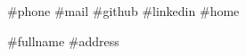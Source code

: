 \boxinfo
{#{phone}}
{#{mail}}
{#{github}}
{#{linkedin}}
{#{home}}

\header
{#{fullname}}
{#{address}}

\begin{abstract}
  \begin{multicols}{2}
    #{summary[0] | render}
    \columnbreak
    #{summary[1] | render}
  \end{multicols}
\end{abstract}
